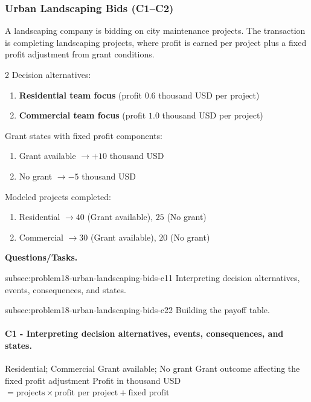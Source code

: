 	\subsubsection{Urban Landscaping Bids (C1--C2)}
	\label{sec:problem18-urban-landscaping-bids-c1-c2}
	A landscaping company is bidding on city maintenance projects. The transaction is completing landscaping projects, where profit is earned per project plus a fixed profit adjustment from grant conditions.

	\begin{multicols}{2}
		Decision alternatives:
		\begin{enumerate}[label=\arabic*.]
			\item \textbf{Residential team focus} (profit $0.6$ thousand USD per project)
			\item \textbf{Commercial team focus} (profit $1.0$ thousand USD per project)
		\end{enumerate}

		Grant states with fixed profit components:
		\begin{enumerate}[label=\arabic*.]
			\item Grant available $\to +10$ thousand USD
			\item No grant $\to -5$ thousand USD
		\end{enumerate}

			\columnbreak

		Modeled projects completed:
		\begin{enumerate}[label=\arabic*.]
			\item Residential $\to 40$ (Grant available), $25$ (No grant)
			\item Commercial $\to 30$ (Grant available), $20$ (No grant)
		\end{enumerate}
	\end{multicols}

	\textbf{Questions/Tasks.}
	\begin{enumerate}
		\CriterionTask
		{subsec:problem18-urban-landscaping-bids-c1}{1}
		{Interpreting decision alternatives, events, consequences, and states.}

		\CriterionTask
		{subsec:problem18-urban-landscaping-bids-c2}{2}
		{Building the payoff table.}
	\end{enumerate}

	\paragraph*{C1 - Interpreting decision alternatives, events, consequences, and states.}
	\label{subsec:problem18-urban-landscaping-bids-c1}
	\DecisionElementsTable
	{Residential; Commercial}
	{Grant available; No grant}
	{Grant outcome affecting the fixed profit adjustment}
	{Profit in thousand USD $= \text{projects} \times \text{profit per project} + \text{fixed profit}$}

